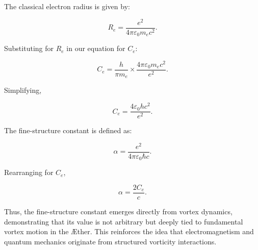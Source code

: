\documentclass[aps,preprint,superscriptaddress]{revtex4-2}
\begin{document}
    The classical electron radius is given by:

    \begin{equation}
        R_e = \frac{e^2}{4 \pi \varepsilon_0 m_e c^2}.
    \end{equation}

    Substituting for $R_e$ in our equation for $C_e$:

    \begin{equation}
        C_e = \frac{h}{\pi m_e} \times \frac{4 \pi \varepsilon_0 m_e c^2}{e^2}.
    \end{equation}

    Simplifying,

    \begin{equation}
        C_e = \frac{4 \varepsilon_0 h c^2}{e^2}.
    \end{equation}

    The fine-structure constant is defined as:

    \begin{equation}
        \alpha = \frac{e^2}{4 \pi \varepsilon_0 \hbar c}.
    \end{equation}

    Rearranging for $C_e$,

    \begin{equation}
        \alpha = \frac{2 C_e}{c}.
    \end{equation}

    Thus, the fine-structure constant emerges directly from vortex dynamics, demonstrating that its value is not arbitrary but deeply tied to fundamental vortex motion in the \AE ther. This reinforces the idea that electromagnetism and quantum mechanics originate from structured vorticity interactions.
\end{document}
